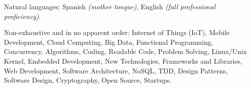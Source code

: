 \documentclass[10pt,a4paper]{article}
\begin{document}
\vspace{0.5em}
\inlineheadsection
  {Natural languages:}
  {Spanish \emph{(mother tongue)}, English \emph{(full professional proficiency)}.}

\spacedhrule{1.6em}{-0.4em}


\inlineheadsection
  {Non-exhaustive and in no apparent order:}
  {Internet of Things (IoT), Mobile Development, Cloud Computing, Big Data, Functional Programming, Concurrency, Algorithms, Coding, Readable Code, Problem Solving, Linux/Unix Kernel, Embedded Development, New Technologies, Frameworks and Libraries, Web Development, Software Architecture, NoSQL, TDD, Design Patterns, Software Design, Cryptography, Open Source, Startups.}
\end{document}
